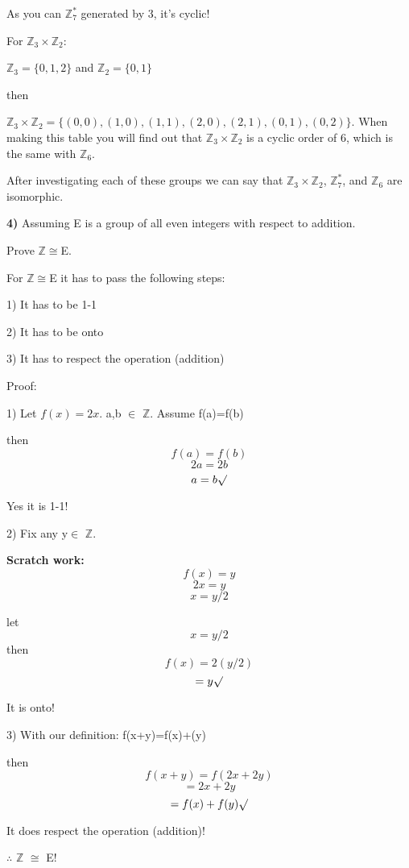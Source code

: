 \documentclass{article}
\begin{document}
As you can $\mathbb{Z}_7^{*}$ generated by 3, it's cyclic! 

\medskip


For $\mathbb{Z}_3\times \mathbb{Z}_2$:
\medskip

 $\mathbb{Z}_3=\{0, 1, 2\}$ and $\mathbb{Z}_2=\{0, 1\}$
 
 \medskip
 then

\medskip

$\mathbb{Z}_3\times \mathbb{Z}_2=\{ (0,0), (1,0), (1,1), (2,0), (2,1), (0,1), (0,2) \}$.
When making this table you will find out that $\mathbb{Z}_3\times \mathbb{Z}_2$ is a cyclic order of 6, which is the same with $\mathbb{Z}_6$.

\medskip
After investigating each of these groups we can say that   $\mathbb{Z}_3\times \mathbb{Z}_2$,  $\mathbb{Z}_7^{*}$, and $\mathbb{Z}_6$ are isomorphic. 


\medskip
\newpage

\textbf{4)}
Assuming E is a group of all even integers with respect to addition.

Prove $\mathbb{Z} \cong$E.
\medskip

For $\mathbb{Z} \cong$E it has to pass the following steps:

1) It has to be 1-1

2) It has to be onto

3) It has to respect the operation (addition)
\medskip


Proof:
\medskip

1) Let $f(x)=2x$. a,b $\in$ $\mathbb{Z}$. Assume f(a)=f(b)

then $$ f(a)=f(b)$$
$$2a=2b$$
$$a=b\surd$$

Yes it is 1-1!
\medskip


2) Fix any y$\in$ $\mathbb{Z}$.

\textbf{Scratch work:}
$$f(x)=y$$
$$2x=y$$
$$x=y/2$$

let $$x=y/2$$
then $$f(x)=2(y/2)$$
$$=y\surd$$

It is onto!

\medskip

3) With our definition: f(x+y)=f(x)+(y)
\medskip

then
$$f(x+y)=f(2x+2y)$$
$$=2x+2y$$
$$=f(x)+f(y)\surd$$

It does respect the operation (addition)!

\medskip


$\therefore$  $\mathbb{Z}$ $\cong$ E!
\end{document}
